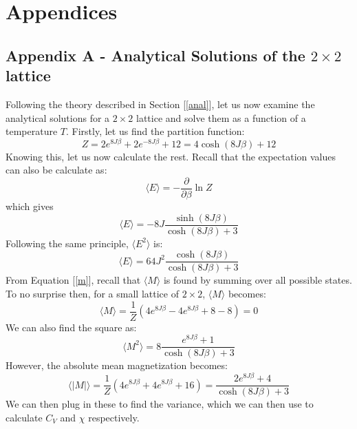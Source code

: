 \documentclass{article}
\begin{document}
\section*{Appendices}
\subsection*{Appendix A - Analytical Solutions of the $2\times 2$ lattice}
Following the theory described in Section [\ref{anal}], let us now examine the analytical solutions for a $2 \times 2$ lattice and solve them as a function of a temperature $T$.
\newline
Firstly, let us find the partition function:
\begin{equation*}
    Z = 2e^{8J\beta} + 2e^{-8J\beta} + 12 = 4\cosh{(8J\beta)} + 12
\end{equation*}
Knowing this, let us now calculate the rest.
\newline
Recall that the expectation values can also be calculate as:
\begin{equation*}
    \langle E \rangle = - \frac{\partial}{\partial \beta} \ln{Z}
\end{equation*}
which gives
\begin{equation*}
    \langle E \rangle = -8J \frac{\sinh{(8J\beta)}}{\cosh{(8J\beta)}+3}
\end{equation*}
Following the same principle, $\langle E^2 \rangle$ is:
\begin{equation*}
    \langle E \rangle = 64J^2 \frac{\cosh{(8J\beta)}}{\cosh{(8J\beta)}+3}
\end{equation*}
From Equation [\ref{m}], recall that $\langle M \rangle$ is found by summing over all possible states. To no surprise then, for a small lattice of $2 \times 2$, $\langle M \rangle$ becomes:
\begin{equation*}
    \langle M \rangle = \frac{1}{Z}(4e^{8J\beta} - 4e^{8J\beta} + 8 - 8) = 0
\end{equation*}
We can also find the square as:
\begin{equation*}
    \langle M^2 \rangle = 8 \frac{e^{8J\beta}+1}{\cosh(8J\beta)+3}
\end{equation*}
However, the absolute mean magnetization becomes:
\begin{equation*}
    \langle |M| \rangle = \frac{1}{Z}(4e^{8J\beta} + 4e^{8J\beta} + 16) = \frac{2e^{8J\beta} + 4}{\cosh{(8J\beta)} + 3}
\end{equation*}
We can then plug in these to find the variance, which we can then use to calculate $C_V$ and $\chi$ respectively.
\end{document}
